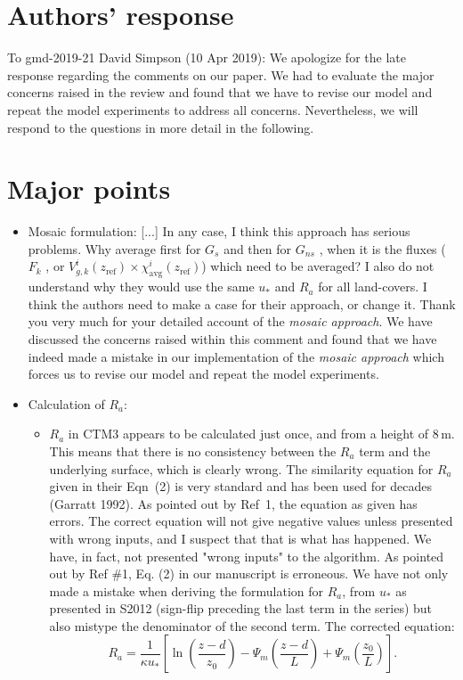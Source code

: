 \documentclass{scrartcl}
\begin{document}
\section*{Authors' response}
To gmd-2019-21 David Simpson (10 Apr 2019):
We apologize for the late response regarding the comments on our paper. We had to evaluate the major concerns raised in the review and found that we have to revise our model and repeat the model experiments to address all concerns. Nevertheless, we will respond to the questions in more detail in the following.

\section{Major points}
\begin{itemize}
\item {\color{blue} Mosaic formulation: [...] In any case, I think this approach has serious problems. Why average first for $G_s$ and then for $G_{ns}$ , when it is the fluxes ($F_k$ , or $V^i_{g,k}(z_\mathrm{ref}) \times \chi^i_\mathrm{avg}(z_\mathrm{ref})$) which need to be averaged? I also do not understand why they would use the same $u_*$ and $R_a$ for all land-covers. I think the authors need to make a case for their approach, or change it.}
  Thank you very much for your detailed account of the \emph{mosaic approach}. We have discussed the concerns raised within this comment and found that we have indeed made a mistake in our implementation of the \emph{mosaic approach} which forces us to revise our model and repeat the model experiments.
\item {\color{blue} Calculation of $R_a$:}
  \begin{itemize}
  \item {\color{blue} $R_a$ in CTM3 appears to be calculated just once, and from a height of 8\,m. This means
that there is no consistency between the $R_a$ term and the underlying surface, which is
clearly wrong. The similarity equation for $R_a$ given in their Eqn~(2) is very standard and has been
used for decades (Garratt 1992). As pointed out by Ref~1, the equation as given has
errors. The correct equation will not give negative values unless presented with wrong
inputs, and I suspect that that is what has happened.}
We have, in fact, not presented "wrong inputs" to the algorithm.
As pointed out by Ref \#1, Eq. (2) in our manuscript is erroneous. We have not only made a mistake when deriving the formulation for $R_a$, from $u_*$ as presented in S2012 (sign-flip preceding the last term in the series) but also mistype the denominator of the second term. The corrected equation:
\begin{equation}
  R_a = \frac{1}{\kappa u_*}\left[{\ln{\left(\frac{z-d}{z_0}\right)}-\Psi_m\left(\frac{z-d}{L}\right)+\Psi_m\left(\frac{z_0}{L}\right)}\right].
  \label{eq:aero_res}
\end{equation}



\end{itemize}
\end{itemize}
\end{document}
